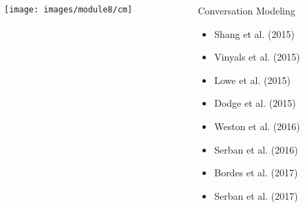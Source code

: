 \begin{frame}
	\begin{columns}
		\begin{column}{0.6\textwidth}
			\vspace{0.2in}
			\begin{overlayarea}{\textwidth}{\textheight}
				\texttt{[image: images/module8/cm]}
			\end{overlayarea}
		\end{column}

		\begin{column}{0.4\textwidth}
			\begin{overlayarea}{\textwidth}{\textheight}

				\begin{block}{Conversation Modeling}
					\begin{itemize}
						\item Shang et al. (2015) \cite{DBLP:conf/acl/ShangLL15}
						\item Vinyals et al. (2015) \cite{DBLP:journals/corr/VinyalsL15}
						\item Lowe et al. (2015) \cite{DBLP:conf/sigdial/LowePSP15}
						\item Dodge et al. (2015) \cite{DBLP:journals/corr/DodgeGZBCMSW15}
						\item Weston et al. (2016) \cite{DBLP:journals/corr/WestonBCM15}
						\item Serban et al. (2016) \cite{DBLP:journals/corr/SerbanSLCPCB16}
						\item Bordes et al. (2017) \cite{DBLP:journals/corr/BordesW16}
						\item Serban et al. (2017) \cite{DBLP:journals/corr/abs-1709-02349}
					\end{itemize}
				\end{block}
			\end{overlayarea}
		\end{column}

	\end{columns}
\end{frame}

